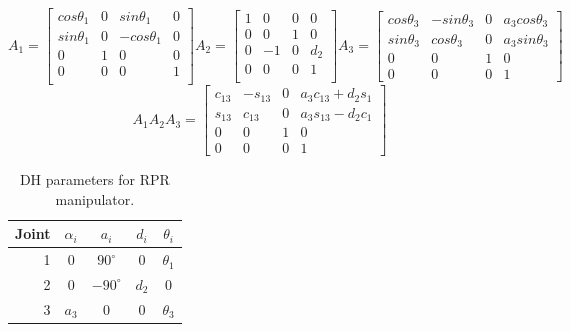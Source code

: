 \documentclass[letterpaper,12pt]{report}
\begin{document}
\begin{subequations}
		\begin{equation}
		A_1 = 
		\begin{bmatrix}
			cos\theta_1&0&sin\theta_1&0\\
			sin\theta_1&0&-cos\theta_1&0\\
			0&1&0&0\\
			0&0&0&1\\
		\end{bmatrix}
		\end{equation}
		\begin{equation}
		A_2 = 
		\begin{bmatrix}
			1&0&0&0\\
			0&0&1&0\\
			0&-1&0&d_2\\
			0&0&0&1\\
		\end{bmatrix}
		\end{equation}
		\begin{equation}
		A_3 = 
		\begin{bmatrix}
			cos\theta_3&-sin\theta_3&0&a_3cos\theta_3\\
			sin\theta_3&cos\theta_3&0&a_3sin\theta_3\\
			0&0&1&0\\
			0&0&0&1
		\end{bmatrix}
		\end{equation}
\label{eq:Amatrices}
\end{subequations}
\begin{equation}
A_1A_2A_3 = 
		\begin{bmatrix}
			c_{13}&-s_{13}&0&a_3c_{13}+d_2s_1\\
			s_{13}&c_{13}&0&a_3s_{13}-d_2c_1\\
			0&0&1&0\\
			0&0&0&1
		\end{bmatrix}
\label{eq:A1A2A3}
\end{equation}
\begin{table}
\centering
	\begin{tabular}{r|c c c c}
		Joint&$\alpha_i$&$a_i$&$d_i$&$\theta_i$\\
		\hline
		1&0&$90^\circ$&0&$\theta_1$\\
		2&0&$-90^\circ$&$d_2$&0\\
		3&$a_3$&0&0&$\theta_3$
	\end{tabular}
\caption{DH parameters for RPR manipulator.}
\label{tab:DHtable}
\end{table}
\end{document}

